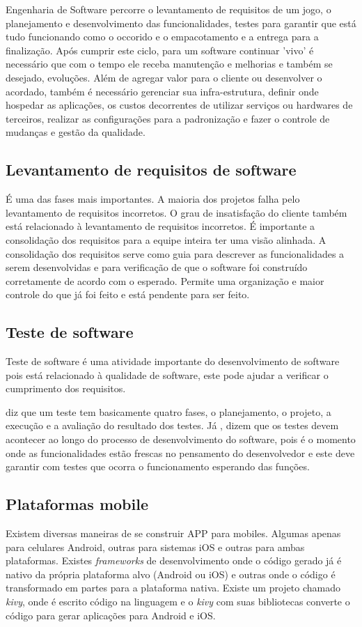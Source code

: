 Engenharia de Software percorre o levantamento de requisitos de um jogo, o planejamento e desenvolvimento das funcionalidades, testes para garantir que está tudo funcionando como o occorido e o empacotamento e a entrega para a finalização. Após cumprir este ciclo, para um software continuar 'vivo' é necessário que com o tempo ele receba manutenção e melhorias e também se desejado, evoluções. Além de agregar valor para o cliente ou desenvolver o acordado, também é necessário gerenciar sua infra-estrutura, definir onde hospedar as aplicações, os custos decorrentes de utilizar serviços ou hardwares de terceiros, realizar as configurações para a padronização e fazer o controle de mudanças e gestão da qualidade.

\subsection[Levantamento de requisitos de software]{Levantamento de requisitos de software}
É uma das fases mais importantes. A maioria dos projetos falha pelo levantamento de requisitos incorretos. O grau de insatisfação do cliente também está relacionado à levantamento de requisitos incorretos. É importante a consolidação dos requisitos para a equipe inteira ter uma visão alinhada. A consolidação dos requisitos serve como guia para descrever as funcionalidades a serem desenvolvidas e para verificação de que o software foi construído corretamente de acordo com o esperado. Permite uma organização e maior controle do que já foi feito e está pendente para ser feito. 

\subsection[Teste de software]{Teste de software}
Teste de software é uma atividade importante do desenvolvimento de software pois está relacionado à qualidade de software, este pode ajudar a verificar o cumprimento dos requisitos.

\cite[p. 17]{Pedro_Henrique} diz que um teste tem basicamente quatro fases, o planejamento, o projeto, a execução e a avaliação do resultado dos testes. Já \cite{pressman}, \cite{delamaroJinoMaldonado} dizem que os testes devem acontecer ao longo do processo de desenvolvimento do software, pois é o momento onde as funcionalidades estão frescas no pensamento do desenvolvedor e este deve garantir com testes que ocorra o funcionamento esperando das funções.


\subsection[Plataformas mobile]{Plataformas mobile}
Existem diversas maneiras de se construir APP para mobiles. Algumas apenas para celulares Android, outras para sistemas iOS e outras para ambas plataformas. Existes \textit{frameworks} de desenvolvimento onde o código gerado já é nativo da própria plataforma alvo (Android ou iOS) e outras onde o código é transformado em partes para a plataforma nativa.
Existe um  projeto chamado \textit{kivy}, onde é escrito código na linguagem  e o \textit{kivy} com suas bibliotecas converte o código para gerar aplicações para Android e iOS.

